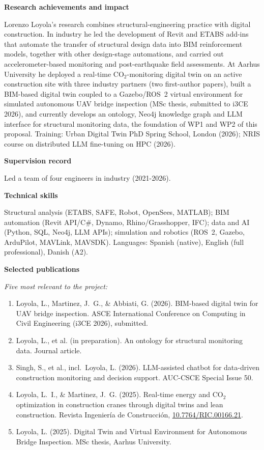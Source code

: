 \documentclass[12pt,a4paper]{article}
\begin{document}
\vspace{0.5cm}
\noindent\textbf{Research achievements and impact}

\noindent Lorenzo Loyola's research combines structural-engineering practice with digital construction. In industry he led the development of Revit and ETABS add-ins that automate the transfer of structural design data into BIM reinforcement models, together with other design-stage automations, and carried out accelerometer-based monitoring and post-earthquake field assessments. At Aarhus University he deployed a real-time CO$_2$-monitoring digital twin on an active construction site with three industry partners (two first-author papers), built a BIM-based digital twin coupled to a Gazebo/ROS~2 virtual environment for simulated autonomous UAV bridge inspection (MSc thesis, submitted to i3CE 2026), and currently develops an ontology, Neo4j knowledge graph and LLM interface for structural monitoring data, the foundation of WP1 and WP2 of this proposal. Training: Urban Digital Twin PhD Spring School, London (2026); NRIS course on distributed LLM fine-tuning on HPC (2026).

\vspace{0.5cm}
\noindent\textbf{Supervision record}

\noindent %
Led a team of four engineers in industry (2021-2026).

\vspace{0.5cm}
\noindent\textbf{Technical skills}

\noindent Structural analysis (ETABS, SAFE, Robot, OpenSees, MATLAB); BIM automation (Revit API/C\#, Dynamo, Rhino/Grasshopper, IFC); data and AI (Python, SQL, Neo4j, LLM APIs); simulation and robotics (ROS~2, Gazebo, ArduPilot, MAVLink, MAVSDK). Languages: Spanish (native), English (full professional), Danish (A2).

\vspace{0.5cm}
\noindent\textbf{Selected publications}

\noindent\textit{Five most relevant to the project:}
\begin{enumerate}
  \item Loyola, L., Martinez, J.~G., \& Abbiati, G. (2026). BIM-based digital twin for UAV bridge inspection. ASCE International Conference on Computing in Civil Engineering (i3CE 2026), submitted.
  \item Loyola, L., et al. (in preparation). An ontology for structural monitoring data. Journal article.
  \item Singh, S., et al., incl.\ Loyola, L. (2026). LLM-assisted chatbot for data-driven construction monitoring and decision support. AUC-CSCE Special Issue 50.
  \item Loyola, L.~I., \& Martinez, J.~G. (2025). Real-time energy and CO$_2$ optimization in construction cranes through digital twins and lean construction. Revista Ingenier\'ia de Construcci\'on, \url{10.7764/RIC.00166.21}.
  \item Loyola, L. (2025). Digital Twin and Virtual Environment for Autonomous Bridge Inspection. MSc thesis, Aarhus University.
\end{enumerate}
\end{document}
